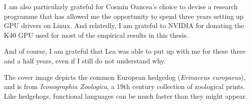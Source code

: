 I am also particularly grateful for Cosmin Oancea's choice to devise a
research programme that has allowed me the opportunity to spend three
years setting up GPU drivers on Linux.  And relatedly, I am grateful
to NVIDIA for donating the K40 GPU used for most of the empirical
results in this thesis.

And of course, I am grateful that Lea was able to put up with me for
these three and a half years, even if I still do not understand why.

The cover image depicts the common European hedgedog
(\textit{Erinaceus europaeus}), and is from \textit{Iconographia
  Zoologica}, a 19th century collection of zoological prints.  Like
hedgehogs, functional languages can be much faster than they might
appear.

